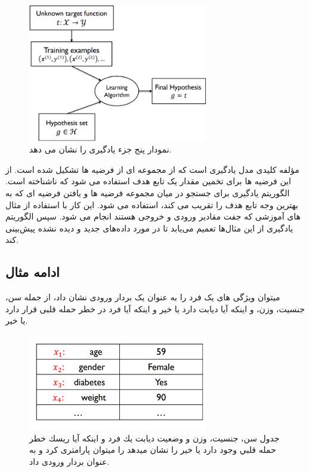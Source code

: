 \documentclass[12pt]{article}
\begin{document}
\begin{figure}[htbp]
    \centering
    \includegraphics[width=0.7\textwidth]{etc/Images/Fig2.png}
    \caption{نمودار پنج جزء یادگیری را نشان می دهد.}
    \label{Fig2}
\end{figure}

مؤلفه کلیدی مدل یادگیری است که از مجموعه ای از فرضیه ها تشکیل شده است. از این فرضیه ها برای تخمین مقدار یک تابع هدف استفاده می شود که ناشناخته است. الگوریتم یادگیری برای جستجو در میان مجموعه فرضیه ها و یافتن فرضیه ای که به بهترین وجه تابع هدف را تقریب می کند، استفاده می شود. این کار با استفاده از مثال های آموزشی که جفت مقادیر ورودی و خروجی هستند انجام می شود. سپس الگوریتم یادگیری از این مثال‌ها تعمیم می‌یابد تا در مورد داده‌های جدید و دیده نشده پیش‌بینی کند.

\subsection*{ادامه مثال}
میتوان ویژگی های یک فرد را به عنوان یک بردار ورودی نشان داد، از جمله سن، جنسیت، وزن، و اینکه آیا دیابت دارد یا خیر و اینکه آیا فرد در خطر حمله قلبی قرار دارد یا خیر.

\begin{figure}[htbp]
    \centering
    \includegraphics[width=0.7\textwidth]{etc/Images/Fig3.png}
    \caption{جدول سن، جنسيت، وزن و وضعيت ديابت يك فرد و اينكه آيا ريسك خطر حمله قلبي وجود دارد يا خير را نشان ميدهد را میتوان پارامتری کرد و به عنوان بردار ورودی داد.}
    \label{Fig3}
\end{figure}
\end{document}
